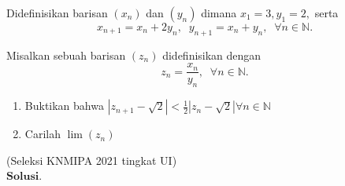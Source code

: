 	Didefinisikan barisan $(x_n)$ dan $(y_n)$ dimana $x_1 = 3, y_1 = 2,$ serta $$x_{n+1}=x_n+2y_n, \; \; y_{n+1}=x_n+y_n, \; \; \forall n \in \mathbb{N}.$$
	
	Misalkan sebuah barisan $(z_n)$ didefinisikan dengan $$z_n = \frac{x_n}{y_n}, \; \; \forall n \in \mathbb{N}.$$
	
	\begin{enumerate}
		\item[ a.] Buktikan bahwa $|z_{n+1}-\sqrt{2}| < \frac12|z_n - \sqrt{2}| \forall n \in \mathbb{N}$
		\item[ b.] Carilah $\lim (z_n)$
	\end{enumerate}

	(Seleksi KNMIPA 2021 tingkat UI)\\
	\newpage
	$\textbf{Solusi. }$
	
